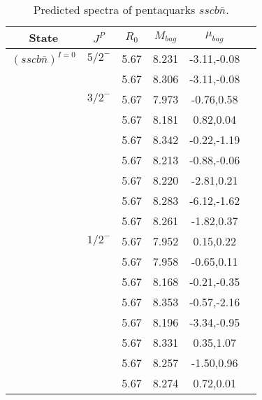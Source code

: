 \documentclass[prd,twocolumn,floatfix,nofootinbib]{revtex4}
\begin{document}
\begin{table*}[!htbp]
    \caption{Predicted spectra of pentaquarks $sscb\bar{n }$.}
    \begin{tabular}{cccccc}
        \hline\hline
        {\rm State} &$J^{P}$ &$R_{0}$ &$M_{bag}$ &$\mu_{bag}$  \\ \hline
        ${(sscb\bar{n})}^{I=0}$
            &${5/2}^{-}$     &5.67   &8.231 &-3.11,-0.08 \\ 
                         &$ $     &5.67   &8.306 &-3.11,-0.08 \\                        
            &${3/2}^{-}$     &5.67   &7.973 &-0.76,0.58\\
                         &$ $     &5.67   &8.181 &0.82,0.04  \\
                         &$ $     &5.67   &8.342 &-0.22,-1.19  \\
                         &$ $     &5.67   &8.213 &-0.88,-0.06 \\
                         &$ $     &5.67   &8.220 &-2.81,0.21  \\
                         &$ $     &5.67   &8.283 &-6.12,-1.62  \\
                         &$ $     &5.67   &8.261 &-1.82,0.37 \\                        
            &${1/2}^{-}$     &5.67   &7.952 &0.15,0.22  \\
                         &$ $     &5.67   &7.958 &-0.65,0.11  \\
                         &$ $     &5.67   &8.168 &-0.21,-0.35  \\
                         &$ $     &5.67   &8.353 &-0.57,-2.16 \\
                         &$ $     &5.67   &8.196 &-3.34,-0.95  \\
                         &$ $     &5.67   &8.331 &0.35,1.07 \\
                         &$ $     &5.67   &8.257 &-1.50,0.96 \\                         
                         &$ $     &5.67   &8.274 &0.72,0.01 \\                          
       \hline\hline
    \end{tabular}
\end{table*}
\end{document}
